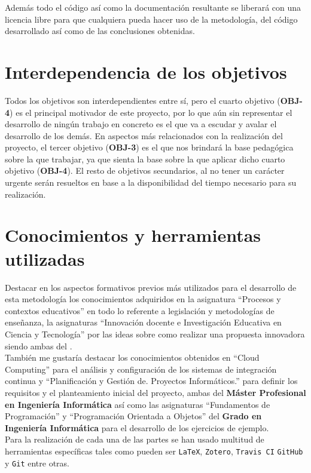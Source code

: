 Además todo el código así como la documentación resultante se liberará con una licencia libre para que cualquiera pueda hacer uso de la metodología, del código desarrollado así como de las conclusiones obtenidas.

\section{Interdependencia de los objetivos}

Todos los objetivos son interdependientes entre sí, pero el cuarto objetivo (\textbf{OBJ-4}) es el principal motivador de este proyecto, por lo que aún sin representar el desarrollo de ningún trabajo en concreto es el que va a escudar y avalar el desarrollo de los demás. En aspectos más relacionados con la realización del proyecto, el tercer objetivo (\textbf{OBJ-3}) es el que nos brindará la base pedagógica sobre la que trabajar, ya que sienta la base sobre la que aplicar dicho cuarto objetivo (\textbf{OBJ-4}). El resto de objetivos secundarios, al no tener un carácter urgente serán resueltos en base a la disponibilidad del tiempo necesario para su realización.

\section{Conocimientos y herramientas utilizadas}

Destacar en los aspectos formativos previos más utilizados para el desarrollo de esta metodología los conocimientos adquiridos en la asignatura ``Procesos y contextos educativos'' en todo lo referente a legislación y metodologías de enseñanza, la asignaturas ``Innovación docente e Investigación Educativa en Ciencia y Tecnología'' por las ideas sobre como realizar una propuesta innovadora siendo ambas del \textbf{\master}.\\

También me gustaría destacar los conocimientos obtenidos en ``Cloud Computing'' para el análisis y configuración de los sistemas de integración continua y ``Planificación y Gestión de. Proyectos Informáticos.'' para definir los requisitos y el planteamiento inicial del proyecto, ambas del \textbf{Máster Profesional en Ingeniería Informática} así como las asignaturas ``Fundamentos de Programación'' y ``Programación Orientada a Objetos'' del \textbf{Grado en Ingeniería Informática} para el desarrollo de los ejercicios de ejemplo.\\

\bigskip
Para la realización de cada una de las partes se han usado multitud de herramientas específicas tales como pueden ser \texttt{LaTeX}, \texttt{Zotero}, \texttt{Travis CI} \texttt{GitHub} y \texttt{Git} entre otras.
